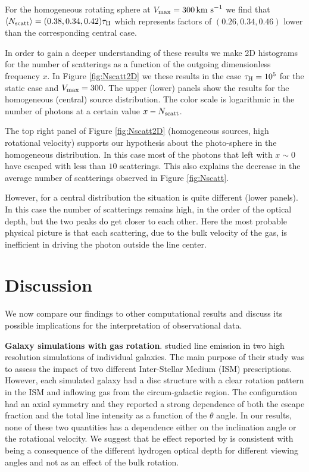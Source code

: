 \documentclass{emulateapj}
\newcommand{\ly}{{\ifmmode{{\rm Ly}\alpha~}\else{Ly$\alpha$~}\fi}}
\newcommand{\kms}{{\ifmmode{{\mathrm{\,km\ s}^{-1}}}\else{\,km~s$^{-1}$}\fi}}
\begin{document}
For the homogeneous rotating sphere at  $V_{\rm{max}}=300\kms$ we find
that $\langle N_{\rm   scatt}\rangle=(0.38, 0.34, 0.42)\tau_{\rm   H}$
which represents   factors of $(0.26, 0.34, 0.46)$ lower than the
corresponding central case.  

In order to gain a deeper understanding of these results  we make 2D
histograms for the number of scatterings as a function of the outgoing
dimensionless frequency $x$. In Figure \ref{fig:Nscatt2D} we these 
results in the case $\tau_{\rm H}=10^5$ for the
static case and $V_{\rm max}=300$\kms. The upper (lower) panels show the
results for the homogeneous (central) source distribution. The color
scale is logarithmic in the number of photons at a certain value
$x-N_{\rm scatt}$. 

The top right panel of Figure \ref{fig:Nscatt2D} (homogeneous sources,
high rotational velocity) supports our hypothesis about
the photo-sphere in the homogeneous distribution. In this case most of
the photons that left with $x\sim 0$ have escaped with less than $10$
scatterings. This also explains the decrease in the average number of
scatterings observed in Figure \ref{fig:Nscatt}.

However, for a central distribution the situation is quite different
(lower panels). In this case the number of scatterings remains high,
in the order of the optical depth, but the two peaks do get closer to each
other. Here the most probable physical picture is that each
scattering, due to the bulk velocity of the gas, is inefficient in
driving the photon outside the line center.


\section{Discussion}
\label{sec:discussion}

We now compare our findings to other computational results and discuss
its possible implications  for the interpretation of observational data.


{\bf Galaxy simulations with gas rotation}. \cite{Verhamme12} studied \ly
line emission in two high resolution simulations of individual
galaxies. The main purpose of their study was to assess the impact of
two different Inter-Stellar Medium (ISM) prescriptions. However, each
simulated galaxy had a disc structure with a clear rotation pattern in
the ISM and inflowing gas from the circum-galactic region. The configuration
had an axial symmetry and they reported a strong dependence of both
the escape fraction and the total line intensity as a function of the
$\theta$ angle. In our results, none of these two quantities has a
dependence either on the inclination angle or the rotational
velocity. We suggest that he effect reported by \cite{Verhamme12} is
consistent with being a consequence of the different hydrogen optical
depth for different viewing angles and not as an effect of the bulk
rotation.
\end{document}
